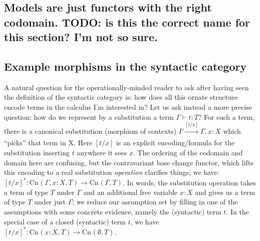 \documentclass[12pt,twoside]{reedthesis}
\theoremstyle{definition}
\theoremstyle{remark}
\theoremstyle{theorem}
\begin{document}
\subsection{Models are just functors with the right codomain. TODO: is this the correct name for this section? I'm not so sure.}




\newcommand{\clone}[3]{{\text{Cn}_{#1}(#2,#3)}}

\subsection{Example morphisms in the syntactic category}
A natural question for the operationally-minded reader to ask after having seen
the definition of the syntactic category is: how does all this ornate structure
encode terms in the calculus I'm interested in? Let us ask instead a more
precise question: how do we represent by a substitution a term \(\Gamma \vdash t : T\)?
For such a term, there is a canonical substitution (morphism of contexts)
\( \Gamma \xrightarrow[]{[t/x]} \Gamma,x:X \) which ``picks'' that term in X. Here $[t/x]$
is an explicit encoding/formula for the substitution inserting $t$ anywhere it
sees $x$. The ordering of the codomain and domain here are confusing, but the
contravariant base change functor, which lifts this encoding to a real
substitution \emph{operation} clarifies things; we have:
\( [t/x]^{*} : \clone{}{\Gamma, x:X}{T} \longrightarrow \clone{}{\Gamma}{T} \). In words, the
substitution operation takes a term of type $T$ under $\Gamma$ and an additional free
variable $x:X$ and gives us a term of type $T$ under just $\Gamma$; we reduce our
assumption set by filling in one of the assumptions with some concrete evidence,
namely the (syntactic) term $t$. In the special case of a closed (syntactic)
term $t$, we have \( [t/x]^{*} : \clone{}{x:X}{T} \longrightarrow \clone{}{\emptyset}{T}\).
\end{document}
